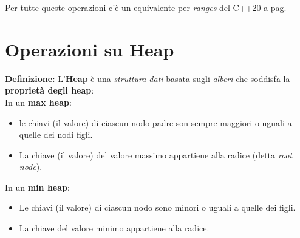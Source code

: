 \fleuron

\textsf{\small Per tutte queste operazioni c'è un equivalente per \emph{ranges} del C++20 a pag. \pageref{ranges_set}} \\


\newpage

\section{Operazioni su Heap}

\textsf{\small \textbf{Definizione: } L'\textbf{Heap} è una \emph{struttura dati} basata sugli \emph{alberi} che soddisfa la \textbf{proprietà degli heap}: } \\

\textsf{\small In un \textbf{max heap}: } \\

\begin{itemize}
	\item \textsf{\small le chiavi (il valore) di ciascun nodo padre son sempre maggiori o uguali a quelle dei nodi figli.}
	\item \textsf{\small La chiave (il valore) del valore massimo appartiene alla radice (detta \emph{root node}).}
\end{itemize}

\textsf{\small In un \textbf{min heap}: } \\

\begin{itemize}
	\item \textsf{\small Le chiavi (il valore) di ciascun nodo sono minori o uguali a quelle dei figli.}
	\item \textsf{\small La chiave del valore minimo appartiene alla radice. }
\end{itemize}

\newpage %

